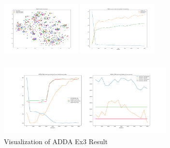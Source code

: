 \documentclass[conference]{IEEEtran}
\begin{document}
\begin{figure}[htb]

\centering
\begin{minipage}[t]{0.26\textwidth}
\includegraphics[width=1.6in, height=1.5in]{Ladda/A2R_no_bn/ADDA_visual.png}
\end{minipage}%
\begin{minipage}[t]{0.26\textwidth}
\includegraphics[width=1.6in, height=1.5in]{Ladda/A2R_no_bn/clf.png}
\end{minipage}%
\begin{minipage}[t]{0.45\textwidth}
\includegraphics[width=3.5in, height=1.5in]{Ladda/A2R_no_bn/gan.png}
\end{minipage}%
\caption{Visualization of ADDA Ex3 Result}\label{fig:Ex3}
\end{figure}
\end{document}
